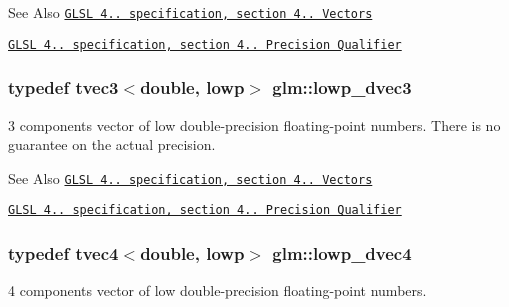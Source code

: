 \begin{DoxySeeAlso}{See Also}
\href{http://www.opengl.org/registry/doc/GLSLangSpec.4.20.8.pdf}{\tt G\-L\-S\-L 4.. specification, section 4.. Vectors} 

\href{http://www.opengl.org/registry/doc/GLSLangSpec.4.20.8.pdf}{\tt G\-L\-S\-L 4.. specification, section 4.. Precision Qualifier} 
\end{DoxySeeAlso}
\hypertarget{group__core__precision_ga88d318815a9af448bddcb16fceb155c5}{
\subsubsection[{lowp\-\_\-dvec3}]{\setlength{\rightskip}{0pt plus 5cm}typedef tvec3$<$double, lowp$>$ {\bf glm\-::lowp\-\_\-dvec3}}}\label{group__core__precision_ga88d318815a9af448bddcb16fceb155c5}
3 components vector of low double-\/precision floating-\/point numbers. There is no guarantee on the actual precision.

\begin{DoxySeeAlso}{See Also}
\href{http://www.opengl.org/registry/doc/GLSLangSpec.4.20.8.pdf}{\tt G\-L\-S\-L 4.. specification, section 4.. Vectors} 

\href{http://www.opengl.org/registry/doc/GLSLangSpec.4.20.8.pdf}{\tt G\-L\-S\-L 4.. specification, section 4.. Precision Qualifier} 
\end{DoxySeeAlso}
\hypertarget{group__core__precision_gaed0097453a4f8b1f3dcf7476aee881cd}{
\subsubsection[{lowp\-\_\-dvec4}]{\setlength{\rightskip}{0pt plus 5cm}typedef tvec4$<$double, lowp$>$ {\bf glm\-::lowp\-\_\-dvec4}}}\label{group__core__precision_gaed0097453a4f8b1f3dcf7476aee881cd}
4 components vector of low double-\/precision floating-\/point numbers.

